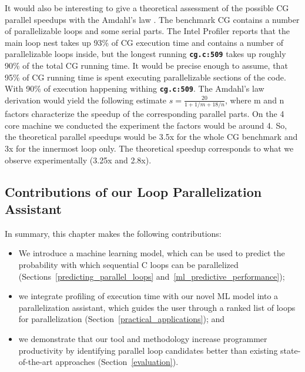 It would also be interesting to give a theoretical assessment of the possible CG parallel speedups with the Amdahl's law \cite{10.1145/1465482.1465560}. The benchmark CG contains a number of parallelizable loops and some serial parts. The Intel Profiler reports that the main loop nest takes up 93\% of CG execution time and contains a number of parallelizable loops inside, but the longest running \textbf{\texttt{cg.c:509}} takes up roughly 90\% of the total CG running time. It would be precise enough to assume, that 95\% of CG running time is spent executing parallelizable sections of the code. With 90\% of execution happening withing \textbf{\texttt{cg.c:509}}. The Amdahl's law derivation would yield the following estimate $s=\frac{20}{1+1/m+18/n}$, where m and n factors characterize the speedup of the corresponding parallel parts. On the 4 core machine we conducted the experiment the factors would be around 4. So, the theoretical parallel speedups would be 3.5x for the whole CG benchmark and 3x for the innermost loop only. The theoretical speedup corresponds to what we observe experimentally (3.25x and 2.8x).      



\subsection{Contributions of our Loop Parallelization Assistant}
\quad In summary, this chapter makes the following contributions:
%
\begin{itemize}
\renewcommand\labelitemi{$\vartriangleright$}
\renewcommand\labelitemii{$\bullet$}
\item We introduce a machine learning model, which can be used to predict the probability with which sequential C loops can be parallelized (Sections~\ref{predicting_parallel_loops} and~\ref{ml_predictive_performance});
\item we integrate profiling of execution time with our novel ML model into a parallelization assistant, which guides the user through a ranked list of loops for parallelization (Section~\ref{practical_applications}); and
\item we demonstrate that our tool and methodology increase programmer productivity by identifying parallel loop candidates better than existing state-of-the-art approaches (Section~\ref{evaluation}).
\end{itemize}

